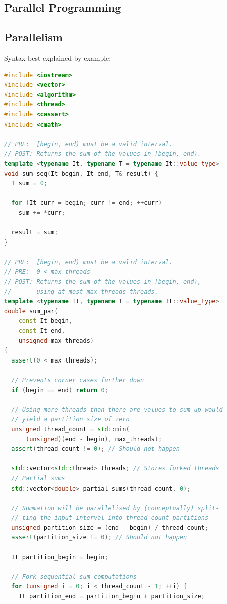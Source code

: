 \vspace{-4pt}
\begin{sectionbox}
\section{Parallel Programming}
\subsection{Parallelism}\smallskip
Syntax best explained by example: 
\end{sectionbox}
\vspace{-4pt}
\begin{lstlisting}[language=C++]
#include <iostream>
#include <vector>
#include <algorithm>
#include <thread>
#include <cassert>
#include <cmath>

// PRE:  [begin, end) must be a valid interval.
// POST: Returns the sum of the values in [begin, end).
template <typename It, typename T = typename It::value_type>
void sum_seq(It begin, It end, T& result) {
  T sum = 0;
  
  for (It curr = begin; curr != end; ++curr)
    sum += *curr;
    
  result = sum;
}

// PRE:  [begin, end) must be a valid interval.
// PRE:  0 < max_threads
// POST: Returns the sum of the values in [begin, end), 
//       using at most max_threads threads.
template <typename It, typename T = typename It::value_type>
double sum_par(
    const It begin, 
    const It end, 
    unsigned max_threads)
{
  assert(0 < max_threads);
  
  // Prevents corner cases further down
  if (begin == end) return 0; 
  
  // Using more threads than there are values to sum up would 
  // yield a partition size of zero
  unsigned thread_count = std::min(
      (unsigned)(end - begin), max_threads);
  assert(thread_count != 0); // Should not happen

  std::vector<std::thread> threads; // Stores forked threads
  // Partial sums
  std::vector<double> partial_sums(thread_count, 0);

  // Summation will be parallelised by (conceptually) split-
  // ting the input interval into thread_count partitions
  unsigned partition_size = (end - begin) / thread_count;
  assert(partition_size != 0); // Should not happen
  
  It partition_begin = begin;

  // Fork sequential sum computations
  for (unsigned i = 0; i < thread_count - 1; ++i) {
    It partition_end = partition_begin + partition_size;
    

\end{lstlisting}
